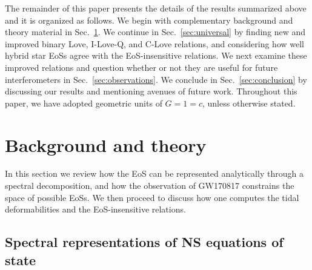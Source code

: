 \documentclass[prd,twocolumn,nofootinbib,superscriptaddress,amsmath,amssymb]{revtex4-1}
\begin{document}
The remainder of this paper presents the details of the results summarized above and it is organized as follows. 
We begin with complementary background and theory material in Sec.~\ref{sec:theory}.
We continue in Sec.~\ref{sec:universal} by finding new and improved binary Love, I-Love-Q, and C-Love relations, and considering how well hybrid star EoSs agree with the EoS-insensitive relations.
We next examine these improved relations and question whether or not they are useful for future interferometers in Sec.~\ref{sec:observations}.
We conclude in Sec.~\ref{sec:conclusion} by discussing our results and mentioning avenues of future work.
Throughout this paper, we have adopted geometric units of $G=1=c$, unless otherwise stated.


\section{Background and theory}\label{sec:theory}

In this section we review how the EoS can be represented analytically
through a spectral decomposition, and how the observation of GW170817
constrains the space of possible EoSs. We then proceed to discuss 
how one computes the tidal deformabilities and the EoS-insensitive relations. 

\subsection{Spectral representations of NS equations of state}
\label{sec:eos}
\end{document}

